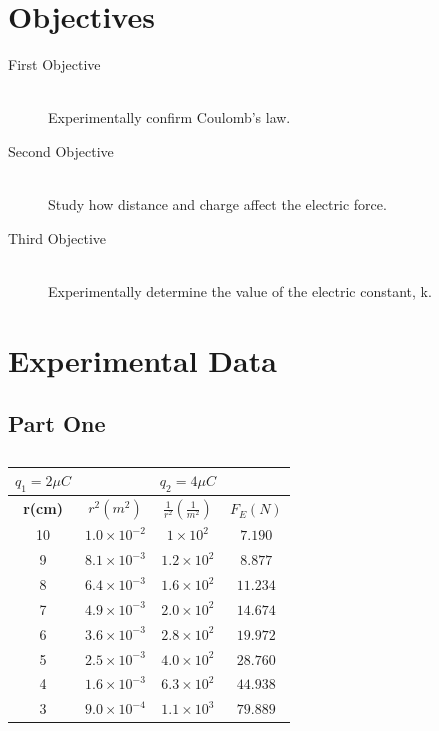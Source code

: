 \documentclass{article}
\begin{document}
\section{Objectives}


\begin{description}
\item[First Objective] \hfill \\
	Experimentally confirm Coulomb's law.
\item[Second Objective] \hfill \\
	Study how distance and charge affect the electric force.
\item[Third Objective] \hfill \\
	Experimentally determine the value of the electric constant, k.
\end{description}



\section{Experimental Data}

\subsection{Part One}%
\label{sub:part_one}


\begin{table}[htpb]
	\centering
	\caption{}
	\label{tab:label}
	\begin{tabular}{| c |  c | c |  c | }
		\hline
		$q_1= 2 \mu C$ & &  $q_2 = 4 \mu C$  &\\
		\hline
		\textbf{r(cm)} & \textbf{$r^2(m^2)$} & $\frac{1}{r^2}(\frac{1}{m^2})$ & $F_{E}(N)$ \\
		\hline
		10 & $1.0 \times 10^{-2}$ & $1\times 10^{2}$& $7.190$ \\
		\hline
		9 & $8.1 \times  10^{-3}$& $1.2 \times 10^{2}$ & $8.877$\\
		\hline
		8 & $6.4 \times 10^{-3}$& $1.6 \times 10^{2}$ & $11.234$\\
		\hline
		7 & $4.9 \times  10^{-3}$& $2.0 \times  10^{2}$ & $14.674$ \\
		\hline
		6 & $3.6 \times 10^{-3}$& $2.8 \times 10^{2}$& $19.972$\\
		\hline
		5 & $2.5 \times 10^{-3}$ & $4.0 \times  10^2$& $28.760$ \\
		\hline
		4 & $1.6 \times  10^{-3}$& $6.3 \times  10^2$ & $44.938$ \\
		\hline
		3 & $9.0 \times  10^{-4}$& $1.1 \times  10^{3}$ & $ 79.889$\\
		\hline
	\end{tabular}
\end{table}
\end{document}

